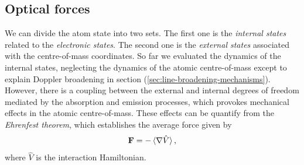 {%
\subsection{Optical forces}
\label{sec:optical-forces}

We can divide the atom state into two sets. The first one is the \textit{internal states} related to the \textit{electronic states}. The second one is the \textit{external states} associated with the centre-of-mass coordinates. So far we evaluated the dynamics of the internal states, neglecting the dynamics of the atomic centre-of-mass except to explain Doppler broadening in section (\ref{sec:line-broadening-mechanisms}). However, there is a coupling between the external and internal degrees of freedom mediated by the absorption and emission processes, which provokes mechanical effects in the atomic centre-of-mass. These effects can be quantify from the \textit{Ehrenfest theorem}, which establishes the average force given by
\begin{equation}
	\mathbf{F} = - \braket{\nabla \hat{V}},
	\label{eq:average-force}
\end{equation}
where $ \hat{V} $ is the interaction Hamiltonian.

}
